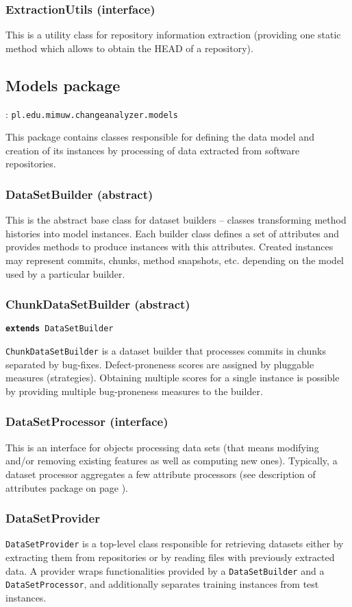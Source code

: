 \documentclass{pracamgr}
\newcommand{\pack}[3]{\subsection{#1 package} \label{sec:#2} \underline{\smash{Full package name}}: \texttt{#3}\medskip}
\newcommand{\extends}[1]{\vspace{-0.5em}\hspace{\parindent}\texttt{\textbf{extends} #1}\vspace{0.5em}}
\begin{document}
\subsubsection*{ExtractionUtils (interface)}
This is a utility class for repository information extraction (providing one static method which allows to obtain the HEAD of a repository).

\pack{Models}{models}{pl.edu.mimuw.changeanalyzer.models}

\noindent This package contains classes responsible for defining the data model and creation of its instances by processing of data extracted from software repositories.

\subsubsection*{DataSetBuilder (abstract)}
This is the abstract base class for dataset builders -- classes transforming method histories into model instances. Each builder class defines a set of attributes and provides methods to produce instances with this attributes. Created instances may represent commits, chunks, method snapshots, etc. depending on the model used by a particular builder.

\subsubsection*{ChunkDataSetBuilder (abstract)}
\extends{DataSetBuilder}

\noindent\texttt{ChunkDataSetBuilder} is a dataset builder that processes commits in chunks separated by bug-fixes. Defect-proneness scores are assigned by pluggable measures (strategies). Obtaining multiple scores for a single instance is possible by providing multiple bug-proneness measures to the builder.

\subsubsection*{DataSetProcessor (interface)}
This is an interface for objects processing data sets (that means modifying and/or removing existing features as well as computing new ones). Typically, a dataset processor aggregates a few attribute processors (see description of attributes package on page \pageref{sec:attributes}).

\subsubsection*{DataSetProvider}
\texttt{DataSetProvider} is a top-level class responsible for retrieving datasets either by extracting them from repositories or by reading files with previously extracted data. A provider wraps functionalities provided by a \texttt{DataSetBuilder} and a \texttt{DataSetProcessor}, and additionally separates training instances from test instances.
\end{document}
